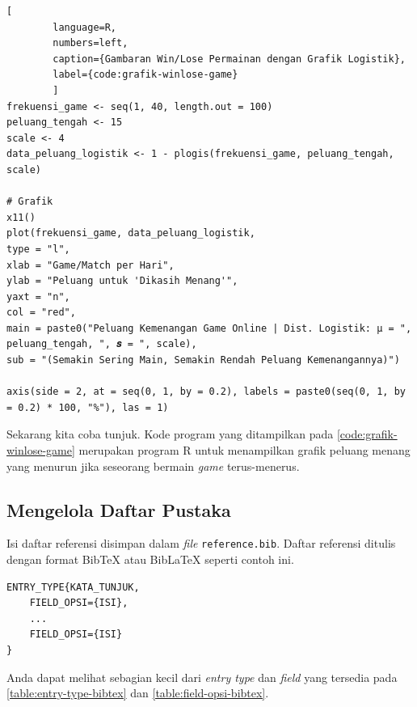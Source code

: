 \begin{enumerate}[]
\begin{lstlisting}[
        language=R, 
        numbers=left,
        caption={Gambaran Win/Lose Permainan dengan Grafik Logistik},
        label={code:grafik-winlose-game}
        ]
frekuensi_game <- seq(1, 40, length.out = 100)
peluang_tengah <- 15
scale <- 4
data_peluang_logistik <- 1 - plogis(frekuensi_game, peluang_tengah, scale)

# Grafik
x11()
plot(frekuensi_game, data_peluang_logistik,
type = "l",
xlab = "Game/Match per Hari",
ylab = "Peluang untuk 'Dikasih Menang'",
yaxt = "n",
col = "red",
main = paste0("Peluang Kemenangan Game Online | Dist. Logistik: μ = ", peluang_tengah, ", 𝒔 = ", scale),
sub = "(Semakin Sering Main, Semakin Rendah Peluang Kemenangannya)")

axis(side = 2, at = seq(0, 1, by = 0.2), labels = paste0(seq(0, 1, by = 0.2) * 100, "%"), las = 1)
    \end{lstlisting}
    
    Sekarang kita coba tunjuk. Kode program yang ditampilkan pada \autoref{code:grafik-winlose-game} merupakan program R untuk menampilkan grafik peluang menang yang menurun jika seseorang bermain \textit{game} terus-menerus.
\end{enumerate}

\subsection{Mengelola Daftar Pustaka}

Isi daftar referensi disimpan dalam \textit{file} \texttt{reference.bib}. Daftar referensi ditulis dengan format BibTeX atau BibLaTeX seperti contoh ini.

\begin{lstlisting}
ENTRY_TYPE{KATA_TUNJUK,
    FIELD_OPSI={ISI},
    ...
    FIELD_OPSI={ISI}
}
\end{lstlisting}

Anda dapat melihat sebagian kecil dari \textit{entry type} dan \textit{field} yang tersedia pada \autoref{table:entry-type-bibtex} dan \autoref{table:field-opsi-bibtex}.

